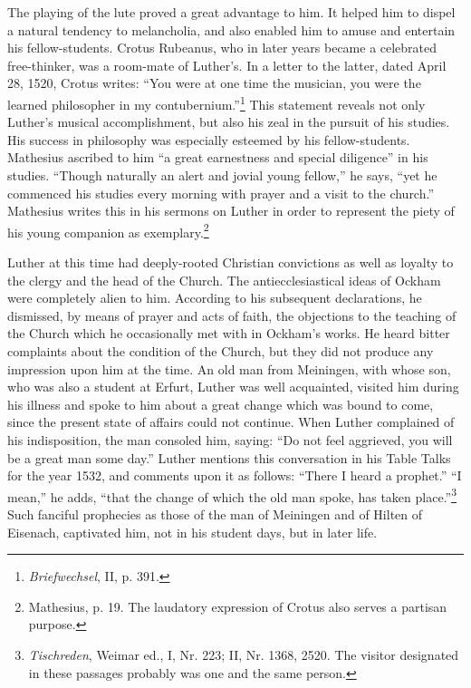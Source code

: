 The playing of the lute proved a great advantage to him. It helped
him to dispel a natural tendency to melancholia, and also enabled
him to amuse and entertain his fellow-students. Crotus Rubeanus,
who in later years became a celebrated free-thinker, was a room-mate
of Luther’s. In a letter to the latter, dated April 28, 1520, Crotus
writes: “You were at one time the musician, you were the learned
philosopher in my contubernium.”\footnote{\textit{Briefwechsel}, II, p. 391.}
This statement reveals not only
Luther’s musical accomplishment, but also his zeal in the pursuit
of his studies. His success in philosophy was especially esteemed by
his fellow-students. Mathesius ascribed to him “a great earnestness
and special diligence” in his studies. “Though naturally an alert and
jovial young fellow,” he says, “yet he commenced his studies every
morning with prayer and a visit to the church.” Mathesius writes
this in his sermons on Luther in order to represent the piety of his
young companion as exemplary.\footnote{Mathesius, p. 19. The laudatory expression of Crotus also serves a partisan purpose.}

Luther at this time had deeply-rooted Christian convictions as
well as loyalty to the clergy and the head of the Church. The antiecclesiastical
ideas of Ockham were completely alien to him. According
to his subsequent declarations, he dismissed, by means of
prayer and acts of faith, the objections to the teaching of the Church
which he occasionally met with in Ockham’s works. He heard bitter
complaints about the condition of the Church, but they did not
produce any impression upon him at the time. An old man from
Meiningen, with whose son, who was also a student at Erfurt, Luther
was well acquainted, visited him during his illness and spoke to him
about a great change which was bound to come, since the present
state of affairs could not continue. When Luther complained of his
indisposition, the man consoled him, saying: “Do not feel aggrieved,
you will be a great man some day.” Luther mentions this conversation
in his Table Talks for the year 1532, and comments upon it as follows: “There I heard a prophet.” “I mean,” he adds, “that
the change of which the old man spoke, has taken place.”\footnote{
    \textit{Tischreden}, Weimar ed., I, Nr. 223; II, Nr. 1368, 2520.
    The visitor designated in these passages probably was one and the same person.}
Such fanciful prophecies as those of the man of Meiningen and of Hilten
of Eisenach, captivated him, not in his student days, but in later life.

